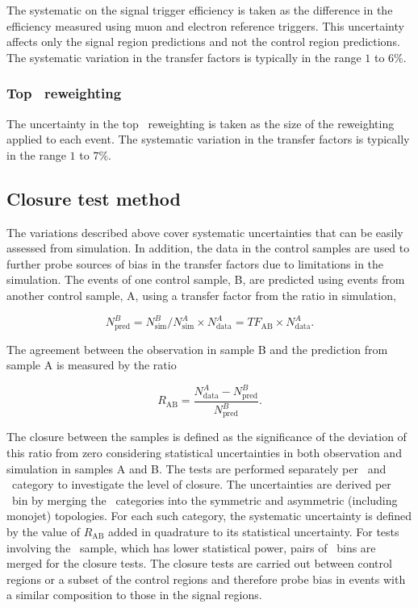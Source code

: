 The systematic on the signal trigger efficiency is taken as the difference in the 
efficiency measured using muon and electron reference triggers. 
This uncertainty affects only the signal region predictions
and not the control region predictions. The systematic variation in the transfer factors is 
typically in the range $1$ to $6\%$.

\subsubsection{Top \pt~reweighting}
The uncertainty in the top \pt~reweighting is taken as the size of the reweighting
applied to each event. The systematic variation in the transfer factors is typically in the range
$1$ to $7\%$.

\subsection{Closure test method}
\label{sec:closure-tests}
The variations described above cover systematic uncertainties that can be easily assessed 
from simulation. In addition, the data in the control samples are used to
further probe sources of bias in the transfer factors due to limitations in the simulation.
The events of one control sample, B, are predicted using events from another control sample, A,
using a transfer factor from the ratio in simulation, 

\begin{equation}
\label{equ:abPred}
N^{B}_{\text{pred}} = N^{B}_{\text{sim}}/N^{A}_{\text{sim}} \times N^{A}_{\text{data}} = TF_{\text{AB}} \times N^{A}_{\text{data}}.
\end{equation}

The agreement between the observation in sample B and the prediction from sample A is measured by the ratio

\begin{equation}
R_{\text{AB}} = \frac{N^{A}_{\text{data}}-N^{B}_{\text{pred}}}{N^{B}_{\text{pred}}}.
\end{equation}


The closure between the samples is defined as the significance of the deviation of this ratio from zero 
considering statistical uncertainties in both observation and simulation in samples A and B.
The tests are performed separately per \njet~and \scalht~category to investigate the level of closure. 
The uncertainties are derived per \scalht~bin by merging the \njet~categories into 
the symmetric and asymmetric (including monojet) topologies. For each such category, the systematic
uncertainty is defined by the value of $R_{\text{AB}}$ added in quadrature to its statistical uncertainty.
For tests involving the \mmj~sample, which has lower statistical power, pairs of \scalht~bins 
are merged for the closure tests. The closure tests are carried out between control regions or a subset
of the control regions and therefore probe bias in events with a similar composition to those in the signal regions.

